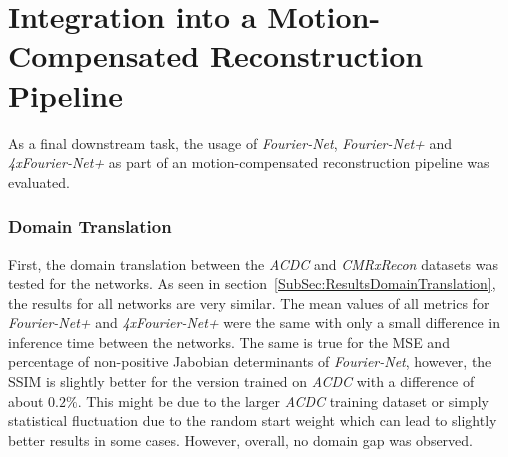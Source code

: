 \section{Integration into a Motion-Compensated Reconstruction Pipeline} \label{Sec:DiscussionIntegrationMotion-CompensatedReconstructionPipeline}
As a final downstream task, the usage of \emph{Fourier-Net}, \emph{Fourier-Net+} and \emph{4xFourier-Net+} as part of an motion-compensated reconstruction pipeline was evaluated.

\subsubsection{Domain Translation} \label{SubSec:DiscussionDomainTranslation}
First, the domain translation between the \emph{ACDC} and \emph{CMRxRecon} datasets was tested for the networks. As seen in section~\ref{SubSec:ResultsDomainTranslation}, the results for all networks are very similar. The mean values of all metrics for \emph{Fourier-Net+} and \emph{4xFourier-Net+} were the same with only a small difference in inference time between the networks. The same is true for the MSE and percentage of non-positive Jabobian determinants of \emph{Fourier-Net}, however, the SSIM is slightly better for the version trained on \emph{ACDC} with a difference of about $0.2 \%$. This might be due to the larger \emph{ACDC} training dataset or simply statistical fluctuation due to the random start weight which can lead to slightly better results in some cases. However, overall, no domain gap was observed.


